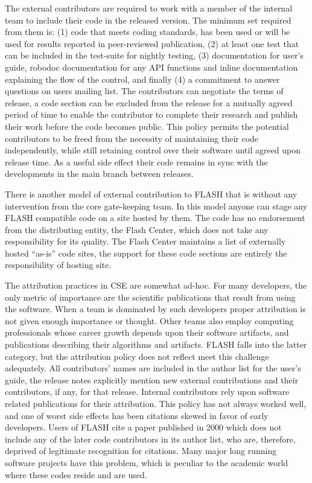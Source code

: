 The external contributors are required to work with a member of the
internal team to include their code in the released version. The
minimum set required from them is:  (1) code that meets coding standards,
has been used or will be used for results reported in peer-reviewed
publication, (2) at least one test that can be included in the
test-suite for nightly testing, (3) documentation for user's guide,
robodoc documentation for any API functions and inline documentation
explaining the flow of the control, and finally (4) a commitment to answer
questions on users mailing list. The contributors can negotiate the
terms of release, a code section can be excluded from the release for
a mutually agreed period of time to enable the contributor to complete
their research and publish their work before the code becomes
public. This policy permits the potential contributors to be freed
from the necessity of maintaining their code independently, while
still retaining control over their software until agreed upon
release time.  As a useful side effect their code remains in sync with
the developments in the main branch between releases.  

There is another model of external contribution to FLASH that is
without any intervention from the core gate-keeping team. In this
model anyone can stage any FLASH compatible code on a site hosted by
them. The code has no endorsement from the distributing entity, the
Flash Center, which does not take any responsibility for its
quality. The Flash Center maintains a list of externally hosted
``as-is'' code sites, the support for these code sections are entirely
the responsibility of hosting site. 

The attribution practices in CSE are somewhat ad-hoc. For many
developers, the only metric of importance are the scientific
publications that result from using the software. When a team is
dominated by such developers proper attribution is not given enough
importance or thought. Other teams also employ computing professionals
whose career growth depends upon their software artifacts, and
publications describing their algorithms and artifacts. FLASH falls
into the latter category, but the attribution policy does not reflect
meet this challenge adequately. All
contributors' names are included in the author list for the user's
guide, the release notes explicitly mention new external
contributions and their contributors, if any, for that
release. Internal contributors rely upon software related publications
for their attribution. This policy has not always worked well, and one
of worst side effects has been citations skewed in favor of early
developers. Users of FLASH cite a paper published in 2000
\cite{Fryxell2000} which does not include any of the later code
contributors in its author list, who are, therefore, deprived of legitimate
recognition for citations.  Many major long running software projects
have this problem, which is peculiar to the academic world where these
codes reside and are used.  

